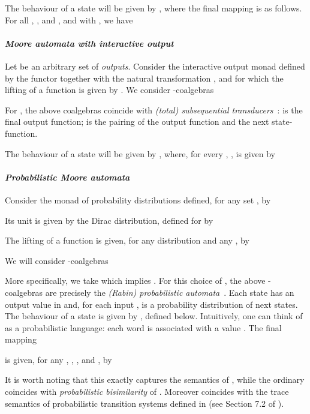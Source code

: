 \documentclass{LMCS}
\begin{document}
The behaviour of a state  will be given by , where
the final mapping is as follows. For all , ,
 and , and
with , we have





\paragraph{\em Moore automata with interactive output}

Let  be an arbitrary set of \emph{outputs}. Consider the interactive output monad defined by
the functor  together with the natural transformation
, and for which the lifting
 of a function  is given by
.
We consider  -coalgebras

For , the above coalgebras coincide with \emph{(total) subsequential transducers}~\cite{helle}: 
 is the final output function;  is the
pairing of the output function and the next state-function.

The behaviour of a state  will be given by 
, where, for every 
, , is given by



\paragraph{\em Probabilistic Moore automata}
Consider the monad of probability distributions defined,
for any set , by

Its unit is given by the Dirac distribution, defined for  by

The lifting 
of a function  is given,
for any distribution 
and any ,  by

We will consider -coalgebras

More specifically, we take  which implies . For this choice of , the above -coalgebras are precisely
the \emph{(Rabin) probabilistic
automata}~\cite{rabin}.
Each state  has an output value in  and, for each
input ,  is a probability distribution of next states. The
behaviour of a state  is given by , defined below. Intuitively, one can think of 
as a probabilistic language: each word is associated with a value
.
The final mapping

is given, for any , , ,
and , by

It is worth noting that this exactly captures the semantics of
\cite{rabin}, while the ordinary  coincides with
\emph{probabilistic bisimilarity} of \cite{LarsenS91}.
Moreover  coincides 
with the trace semantics of probabilistic transition systems defined in \cite{HJS} (see Section 7.2 of \cite{JSS}). 
\end{document}
